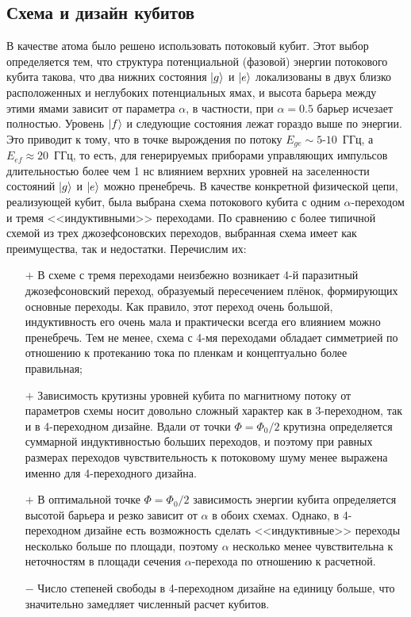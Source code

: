 \subsection{Схема и дизайн кубитов}
В качестве атома было решено использовать потоковый кубит. Этот выбор определяется тем, что структура потенциальной (фазовой) энергии потокового кубита такова, что два нижних состояния $\ket{g}$ и $\ket{e}$ локализованы в двух близко расположенных и неглубоких потенциальных ямах, и высота барьера между этими ямами зависит от параметра $\alpha$, в частности, при $\alpha=0.5$ барьер исчезает полностью. Уровень $\ket{f}$ и следующие состояния лежат гораздо выше по энергии.  Это приводит к тому, что в точке вырождения по потоку $E_{ge} \sim 5$-$10$~ГГц, а $E_{ef} \approx 20$~ГГц, то есть, для генерируемых приборами управляющих импульсов длительностью более чем 1 нс влиянием верхних уровней на заселенности состояний $\ket{g}$ и $\ket{e}$ можно пренебречь. 
В качестве конкретной физической цепи, реализующей кубит, была выбрана схема потокового кубита с одним $\alpha$-переходом и тремя <<индуктивными>> переходами. По сравнению с более типичной схемой из трех джозефсоновских переходов, выбранная схема имеет как преимущества, так и недостатки. Перечислим их:

\begin{itemize}
	\item[$+$] В схеме с тремя переходами неизбежно возникает 4-й паразитный джозефсоновский переход, образуемый пересечением плёнок, формирующих основные переходы. Как правило, этот переход очень большой, индуктивность его очень мала и практически всегда его влиянием можно пренебречь. Тем не менее, схема с 4-мя переходами обладает симметрией по отношению к протеканию тока по пленкам и концептуально более правильная;
	\item[$+$] Зависимость крутизны уровней кубита по магнитному потоку от параметров схемы носит довольно сложный характер как в 3-переходном, так и в 4-переходном дизайне. Вдали от точки $\Phi=\Phi_0/2$ крутизна определяется суммарной индуктивностью больших переходов, и поэтому при равных размерах переходов чувствительность к потоковому шуму менее выражена именно для 4-переходного дизайна. 
	\item[$+$] В оптимальной точке $\Phi=\Phi_0/2$  зависимость энергии кубита определяется высотой барьера и резко зависит от $\alpha$ в обоих схемах. Однако, в 4-переходном дизайне есть возможность сделать <<индуктивные>> переходы несколько больше по площади, поэтому $\alpha$ несколько менее чувствительна к неточностям в площади сечения $\alpha$-перехода по отношению к расчетной.
	\item[$-$] Число степеней свободы в 4-переходном дизайне на единицу больше, что значительно замедляет численный расчет кубитов. 
\end{itemize}

